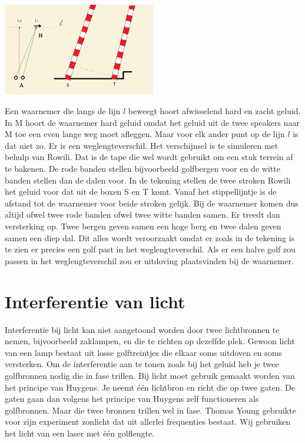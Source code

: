 \documentclass[../main.tex]{subfiles}
\begin{document}
\begin{center}
\leavevmode
\includegraphics[width=0.5\textwidth]{./img/tweebronnen.png}
\end{center}

Een waarnemer die langs de lijn $l$ beweegt hoort afwisselend hard en zacht geluid. In M hoort de waarnemer hard geluid omdat het geluid uit de twee speakers naar M toe een even lange weg moet afleggen. Maar voor elk ander punt op de lijn $l$ is dat niet zo. Er is een weglengteverschil. Het verschijnsel is te simuleren met behulp van Rowili. Dat is de tape die wel wordt gebruikt om een stuk terrein af te bakenen. De rode banden stellen bijvoorbeeld golfbergen voor en de witte banden stellen dan de dalen voor. In de tekening stellen de twee stroken Rowili het geluid voor dat uit de boxen S en T komt. Vanaf het stippellijntje is de afstand tot de waarnemer voor beide stroken gelijk. Bij de waarnemer komen dus altijd ofwel twee rode banden ofwel twee witte banden samen. Er treedt dan versterking op. Twee bergen geven samen een hoge berg en twee dalen geven samen een diep dal. Dit alles wordt veroorzaakt omdat er zoals in de tekening is te zien er precies een golf past in het weglengteverschil. Als er een halve golf zou passen in het weglengteverschil zou er uitdoving plaatsvinden bij de waarnemer. 

\section{Interferentie van licht} 
Interferentie bij licht kan niet aangetoond worden door twee lichtbronnen te nemen, bijvoorbeeld zaklampen, en die te richten op dezelfde plek. Gewoon licht van een lamp bestaat uit losse golftreintjes die elkaar soms uitdoven en soms versterken. Om de interferentie aan te tonen zoals bij het geluid heb je twee golfbronnen nodig die in fase trillen. Bij licht moet gebruik gemaakt worden van het principe van Huygens. Je neemt \'e\'en lichtbron en richt die op twee gaten. De gaten gaan dan volgens het principe van Huygens zelf functioneren als golfbronnen. Maar die twee bronnen trillen wel in fase. Thomas Young gebruikte voor zijn experiment zonlicht dat uit allerlei frequenties bestaat. Wij gebruiken het licht van een laser met \'e\'en golflengte.
\end{document}
